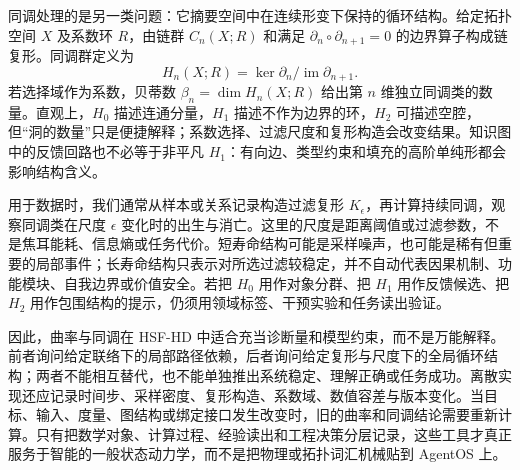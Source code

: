 同调处理的是另一类问题：它摘要空间中在连续形变下保持的循环结构。给定拓扑空间 $X$ 及系数环 $R$，由链群 $C_n(X;R)$ 和满足 $\partial_n\circ\partial_{n+1}=0$ 的边界算子构成链复形。同调群定义为
\[
  H_n(X;R)=\ker\partial_n/\operatorname{im}\partial_{n+1}.
\]
若选择域作为系数，贝蒂数 $\beta_n=\dim H_n(X;R)$ 给出第 $n$ 维独立同调类的数量。直观上，$H_0$ 描述连通分量，$H_1$ 描述不作为边界的环，$H_2$ 可描述空腔，但“洞的数量”只是便捷解释；系数选择、过滤尺度和复形构造会改变结果。知识图中的反馈回路也不必等于非平凡 $H_1$：有向边、类型约束和填充的高阶单纯形都会影响结构含义。

用于数据时，我们通常从样本或关系记录构造过滤复形 $K_\epsilon$，再计算持续同调，观察同调类在尺度 $\epsilon$ 变化时的出生与消亡。这里的尺度是距离阈值或过滤参数，不是焦耳能耗、信息熵或任务代价。短寿命结构可能是采样噪声，也可能是稀有但重要的局部事件；长寿命结构只表示对所选过滤较稳定，并不自动代表因果机制、功能模块、自我边界或价值安全。若把 $H_0$ 用作对象分群、把 $H_1$ 用作反馈候选、把 $H_2$ 用作包围结构的提示，仍须用领域标签、干预实验和任务读出验证。

因此，曲率与同调在 HSF-HD 中适合充当诊断量和模型约束，而不是万能解释。前者询问给定联络下的局部路径依赖，后者询问给定复形与尺度下的全局循环结构；两者不能相互替代，也不能单独推出系统稳定、理解正确或任务成功。离散实现还应记录时间步、采样密度、复形构造、系数域、数值容差与版本变化。当目标、输入、度量、图结构或绑定接口发生改变时，旧的曲率和同调结论需要重新计算。只有把数学对象、计算过程、经验读出和工程决策分层记录，这些工具才真正服务于智能的一般状态动力学，而不是把物理或拓扑词汇机械贴到 AgentOS 上。
